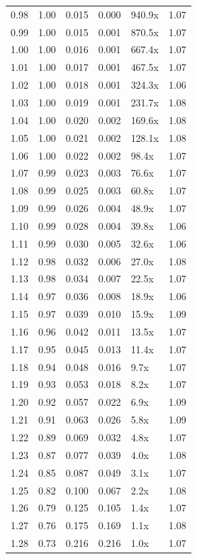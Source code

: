 \begin{tabular}{rrrrlr}
0.98 & 1.00 & 0.015 & 0.000 & 940.9x & 1.07 \\
0.99 & 1.00 & 0.015 & 0.001 & 870.5x & 1.07 \\
1.00 & 1.00 & 0.016 & 0.001 & 667.4x & 1.07 \\
1.01 & 1.00 & 0.017 & 0.001 & 467.5x & 1.07 \\
1.02 & 1.00 & 0.018 & 0.001 & 324.3x & 1.06 \\
1.03 & 1.00 & 0.019 & 0.001 & 231.7x & 1.08 \\
1.04 & 1.00 & 0.020 & 0.002 & 169.6x & 1.08 \\
1.05 & 1.00 & 0.021 & 0.002 & 128.1x & 1.08 \\
1.06 & 1.00 & 0.022 & 0.002 & 98.4x & 1.07 \\
1.07 & 0.99 & 0.023 & 0.003 & 76.6x & 1.07 \\
1.08 & 0.99 & 0.025 & 0.003 & 60.8x & 1.07 \\
1.09 & 0.99 & 0.026 & 0.004 & 48.9x & 1.07 \\
1.10 & 0.99 & 0.028 & 0.004 & 39.8x & 1.06 \\
1.11 & 0.99 & 0.030 & 0.005 & 32.6x & 1.06 \\
1.12 & 0.98 & 0.032 & 0.006 & 27.0x & 1.08 \\
1.13 & 0.98 & 0.034 & 0.007 & 22.5x & 1.07 \\
1.14 & 0.97 & 0.036 & 0.008 & 18.9x & 1.06 \\
1.15 & 0.97 & 0.039 & 0.010 & 15.9x & 1.09 \\
1.16 & 0.96 & 0.042 & 0.011 & 13.5x & 1.07 \\
1.17 & 0.95 & 0.045 & 0.013 & 11.4x & 1.07 \\
1.18 & 0.94 & 0.048 & 0.016 & 9.7x & 1.07 \\
1.19 & 0.93 & 0.053 & 0.018 & 8.2x & 1.07 \\
1.20 & 0.92 & 0.057 & 0.022 & 6.9x & 1.09 \\
1.21 & 0.91 & 0.063 & 0.026 & 5.8x & 1.09 \\
1.22 & 0.89 & 0.069 & 0.032 & 4.8x & 1.07 \\
1.23 & 0.87 & 0.077 & 0.039 & 4.0x & 1.08 \\
1.24 & 0.85 & 0.087 & 0.049 & 3.1x & 1.07 \\
1.25 & 0.82 & 0.100 & 0.067 & 2.2x & 1.08 \\
1.26 & 0.79 & 0.125 & 0.105 & 1.4x & 1.07 \\
1.27 & 0.76 & 0.175 & 0.169 & 1.1x & 1.08 \\
1.28 & 0.73 & 0.216 & 0.216 & 1.0x & 1.07 \\

\end{tabular}

